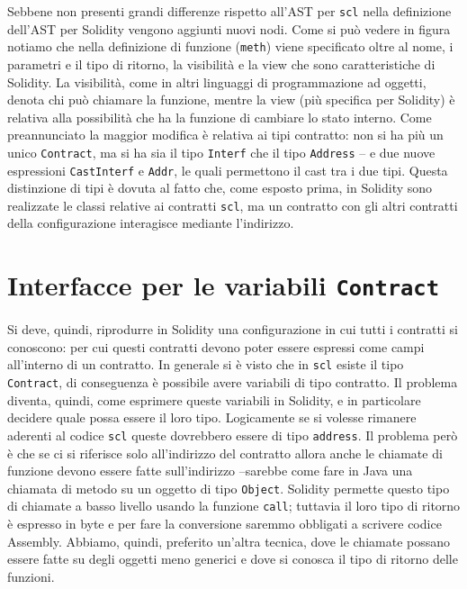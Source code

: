 \documentclass[12pt,a4paper]{report}
\begin{document}
Sebbene non presenti grandi differenze rispetto all'AST per \texttt{scl}
nella definizione dell'AST per Solidity vengono aggiunti nuovi nodi.
Come si può vedere in figura notiamo che nella definizione di funzione
(\texttt{meth}) viene specificato oltre al nome, i parametri e il tipo
di ritorno, la visibilità e la view che sono caratteristiche di
Solidity. La visibilità, come in altri linguaggi di programmazione ad
oggetti, denota chi può chiamare la funzione, mentre la view (più
specifica per Solidity) è relativa alla possibilità che ha la funzione
di cambiare lo stato interno. Come preannunciato la maggior modifica è
relativa ai tipi contratto: non si ha più un unico \texttt{Contract}, ma
si ha sia il tipo \texttt{Interf} che il tipo \texttt{Address} -- e due
nuove espressioni \texttt{CastInterf} e \texttt{Addr}, le quali
permettono il cast tra i due tipi. Questa distinzione di tipi è dovuta
al fatto che, come esposto prima, in Solidity sono realizzate le classi
relative ai contratti \texttt{scl}, ma un contratto con gli altri
contratti della configurazione interagisce mediante l'indirizzo.

\hypertarget{interfacce-per-le-variabili-contract}{%
\section{\texorpdfstring{Interfacce per le variabili
\texttt{Contract}}{Interfacce per le variabili Contract}}\label{interfacce-per-le-variabili-contract}}

Si deve, quindi, riprodurre in Solidity una configurazione in cui tutti
i contratti si conoscono: per cui questi contratti devono poter essere
espressi come campi all'interno di un contratto. In generale si è visto
che in \texttt{scl} esiste il tipo \texttt{Contract}, di conseguenza è
possibile avere variabili di tipo contratto. Il problema diventa,
quindi, come esprimere queste variabili in Solidity, e in particolare
decidere quale possa essere il loro tipo. Logicamente se si volesse
rimanere aderenti al codice \texttt{scl} queste dovrebbero essere di
tipo \texttt{address}. Il problema però è che se ci si riferisce solo
all'indirizzo del contratto allora anche le chiamate di funzione devono
essere fatte sull'indirizzo --sarebbe come fare in Java una chiamata di
metodo su un oggetto di tipo \texttt{Object}. Solidity permette questo
tipo di chiamate a basso livello usando la funzione \texttt{call};
tuttavia il loro tipo di ritorno è espresso in byte e per fare la
conversione saremmo obbligati a scrivere codice Assembly. Abbiamo,
quindi, preferito un'altra tecnica, dove le chiamate possano essere
fatte su degli oggetti meno generici e dove si conosca il tipo di
ritorno delle funzioni.
\end{document}
